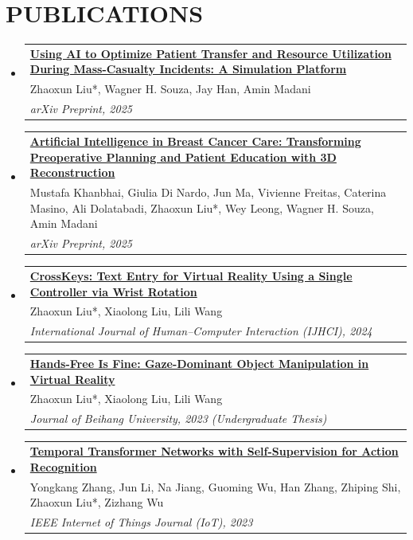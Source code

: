 \documentclass[letterpaper,11pt]{article}
\newcommand{\publication}[3]{
  \vspace{-2pt}\item
    \begin{tabular*}{1.0\textwidth}[t]{p{0.98\textwidth}}
    \textbf{\small{#1}} \\
    {#3} \\
    \textit{#2} \\
    \end{tabular*}\vspace{-7pt}
}
\newcommand{\resumeSubHeadingListStart}{\begin{itemize}[leftmargin=0.0in, label={}]}
\newcommand{\resumeSubHeadingListEnd}{\end{itemize}}
\begin{document}


\section{PUBLICATIONS}
    \resumeSubHeadingListStart
        \publication{\href{https://arxiv.org/abs/2509.08756}{Using AI to Optimize Patient Transfer and Resource Utilization During Mass-Casualty Incidents: A Simulation Platform}}{arXiv Preprint, 2025}{Zhaoxun Liu*, Wagner H. Souza, Jay Han, Amin Madani}
        \publication{\href{https://arxiv.org/abs/2509.12242}{Artificial Intelligence in Breast Cancer Care: Transforming Preoperative Planning and Patient Education with 3D Reconstruction}}{arXiv Preprint, 2025}{Mustafa Khanbhai, Giulia Di Nardo, Jun Ma, Vivienne Freitas, Caterina Masino, Ali Dolatabadi, Zhaoxun Liu*, Wey Leong, Wagner H. Souza, Amin Madani}
        \publication{\href{https://doi.org/10.1080/10447318.2024.2358456}{CrossKeys: Text Entry for Virtual Reality Using a Single Controller via Wrist Rotation}}{International Journal of Human–Computer Interaction (IJHCI), 2024}{Zhaoxun Liu*, Xiaolong Liu, Lili Wang}
        \publication{\href{https://lorenz.fun/files/hands-free-is-fine.pdf}{Hands-Free Is Fine: Gaze-Dominant Object Manipulation in Virtual Reality}}{Journal of Beihang University, 2023 (Undergraduate Thesis)}{Zhaoxun Liu*, Xiaolong Liu, Lili Wang}
        \publication{\href{https://doi.org/10.1109/JIOT.2023.3257992}{Temporal Transformer Networks with Self-Supervision for Action Recognition}}{IEEE Internet of Things Journal (IoT), 2023}{Yongkang Zhang, Jun Li, Na Jiang, Guoming Wu, Han Zhang, Zhiping Shi, Zhaoxun Liu*, Zizhang Wu}
    \resumeSubHeadingListEnd

\end{document}

